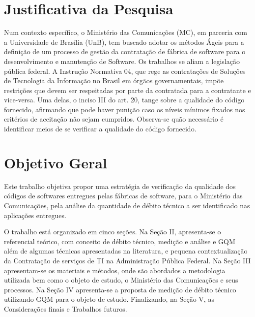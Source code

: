 \section{Justificativa da Pesquisa}
Num contexto específico, o Ministério das Comunicações (MC), em parceria com a
Universidade de Brasília (UnB), tem buscado adotar os métodos Ágeis para a
definição de um processo de gestão da contratação de fábrica de software para o
desenvolvimento e manutenção de Software.
Os trabalhos se aliam a legislação pública federal. A Instrução Normativa 04,
que rege as contratações de Soluções de Tecnologia da Informação no
 Brasil em órgãos governamentais, impõe restrições que devem ser respeitadas por
 parte da contratada para a contratante e vice-versa. Uma delas, o inciso III do
 art. 20, tange sobre a qualidade do código fornecido, afirmando que pode haver
 punição caso os níveis mínimos fixados nos critérios de aceitação não sejam
 cumpridos. Observa-se quão necessário é identificar meios de se verificar a
 qualidade do código fornecido.

\section{Objetivo Geral}
 Este trabalho objetiva propor uma estratégia de verificação da qualidade dos
 códigos de softwares entregues pelas fábricas de software, para o Ministério
 das Comunicações, pela análise da quantidade de débito técnico a ser identificado
 nas aplicações entregues.

 O trabalho está organizado em cinco seções. Na Seção II, apresenta-se o
 referencial teórico, com conceito de débito técnico, medição e análise e GQM
 além de algumas técnicas
 apresentadas na literatura, e pequena contextualização da Contratação de
 serviços de TI na Administração Pública Federal. Na Seção III apresentam-se
 os materiais e métodos, onde são abordados a metodologia utilizada bem como o
 objeto de estudo, o Ministério das Comunicações e seus processos. Na Seção IV
 apresenta-se a proposta de medição de débito técnico utilizando GQM para o objeto de estudo.
 Finalizando, na Seção V, as Considerações finais e Trabalhos futuros.

